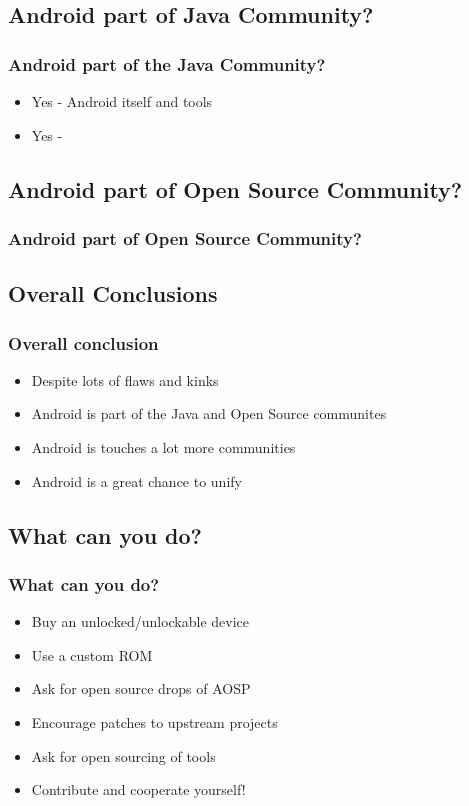 \documentclass{beamer}
\begin{document}
  \subsection{Android part of Java Community?}
    \begin{frame}
     \frametitle{Android part of the Java Community?}
     \begin{itemize}
      \item<1-> Yes - Android itself and tools
      \item<2-> Yes - 
     \end{itemize}
    \end{frame}
  
  \subsection{Android part of Open Source Community?}
    \begin{frame}
     \frametitle{Android part of Open Source Community?} 
    \end{frame}

  \subsection{Overall Conclusions}
    \begin{frame}
      \frametitle {Overall conclusion}
      \begin{itemize}
        \item<1-> Despite lots of flaws and kinks
        \item<2-> Android is part of the Java and Open Source communites
        \item<3-> Android is touches a lot more communities 
        \item<4-> Android is a great chance to unify 
      \end{itemize}
    \end{frame}

  \subsection{What can you do?}
    \begin{frame}
      \frametitle{What can you do?}
      \begin{itemize}
        \item<1-> Buy an unlocked/unlockable device
        \item<2-> Use a custom ROM
        \item<3-> Ask for open source drops of AOSP 
        \item<4-> Encourage patches to upstream projects
        \item<5-> Ask for open sourcing of tools
        \item<6-> Contribute and cooperate yourself! 
      \end{itemize}
    \end{frame}
\end{document}
